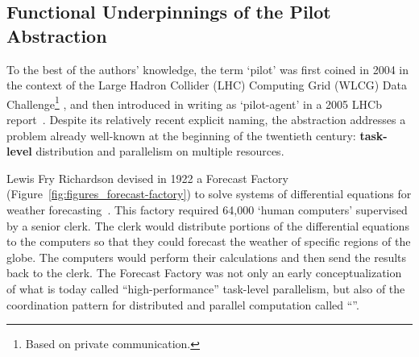 \documentclass{sig-alternate}
\begin{document}

  


\subsection{Functional Underpinnings of the Pilot Abstraction}
\label{sec:histabstr}

To the best of the authors' knowledge, the term `pilot' was first coined in 2004
in the context of the Large Hadron Collider (LHC) Computing Grid (WLCG) Data
Challenge\footnote{Based on private communication.}
\cite{lhc_url,lhc1995large,wlcg_url,bonacorsi2007wlcg}, and then introduced in
writing as `pilot-agent' in a 2005 LHCb report~\cite{nobrega2005lhcb,lhcb_url}.
Despite its relatively recent explicit naming, the \pilot abstraction addresses
a problem already well-known at the beginning of the twentieth century: {\bf
task-level} distribution and parallelism on multiple resources.

Lewis Fry Richardson devised in 1922 a Forecast
Factory~\cite{lynch1999richardson} (Figure~\ref{fig:figures_forecast-factory})
to solve systems of differential equations for weather
forecasting~\cite{richardson1922weather}. This factory required 64,000 `human
computers' supervised by a senior clerk. The clerk would distribute portions of
the differential equations to the computers so that they could forecast the
weather of specific regions of the globe. The computers would perform their
calculations and then send the results back to the clerk. The Forecast Factory
was not only an early conceptualization of what is today called
``high-performance'' task-level parallelism, but also of the coordination
pattern for distributed and parallel computation called ``\MW''.
\end{document}
